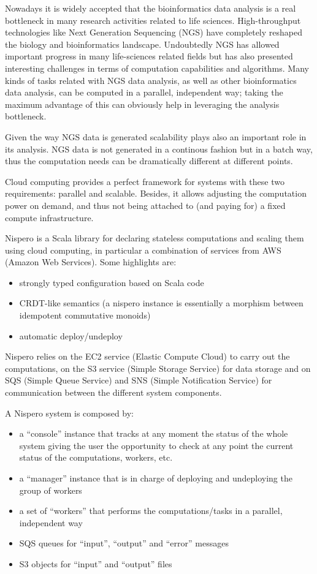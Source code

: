 Nowadays it is widely accepted that the bioinformatics data analysis is
a real bottleneck in many research activities related to life sciences.
High-throughput technologies like Next Generation Sequencing (NGS) have
completely reshaped the biology and bioinformatics landscape.
Undoubtedly NGS has allowed important progress in many life-sciences
related fields but has also presented interesting challenges in terms of
computation capabilities and algorithms. Many kinds of tasks related
with NGS data analysis, as well as other bioinformatics data analysis,
can be computed in a parallel, independent way; taking the maximum
advantage of this can obviously help in leveraging the analysis
bottleneck.

Given the way NGS data is generated scalability plays also an important
role in its analysis. NGS data is not generated in a continous fashion
but in a batch way, thus the computation needs can be dramatically
different at different points.

Cloud computing provides a perfect framework for systems with these two
requirements: parallel and scalable. Besides, it allows adjusting the
computation power on demand, and thus not being attached to (and paying
for) a fixed compute infrastructure.

Nispero is a Scala library for declaring stateless computations and
scaling them using cloud computing, in particular a combination of
services from AWS (Amazon Web Services). Some highlights are:

\begin{itemize}
\itemsep1pt\parskip0pt
\item
  strongly typed configuration based on Scala code
\item
  CRDT-like semantics (a nispero instance is essentially a morphism
  between idempotent commutative monoids)
\item
  automatic deploy/undeploy
\end{itemize}

Nispero relies on the EC2 service (Elastic Compute Cloud) to carry out
the computations, on the S3 service (Simple Storage Service) for data
storage and on SQS (Simple Queue Service) and SNS (Simple Notification
Service) for communication between the different system components.

A Nispero system is composed by:

\begin{itemize}
\itemsep1pt\parskip0pt
\item
  a ``console'' instance that tracks at any moment the status of the
  whole system giving the user the opportunity to check at any point the
  current status of the computations, workers, etc.
\item
  a ``manager'' instance that is in charge of deploying and undeploying
  the group of workers
\item
  a set of ``workers'' that performs the computations/tasks in a
  parallel, independent way
\item
  SQS queues for ``input'', ``output'' and ``error'' messages
\item
  S3 objects for ``input'' and ``output'' files
\end{itemize}


